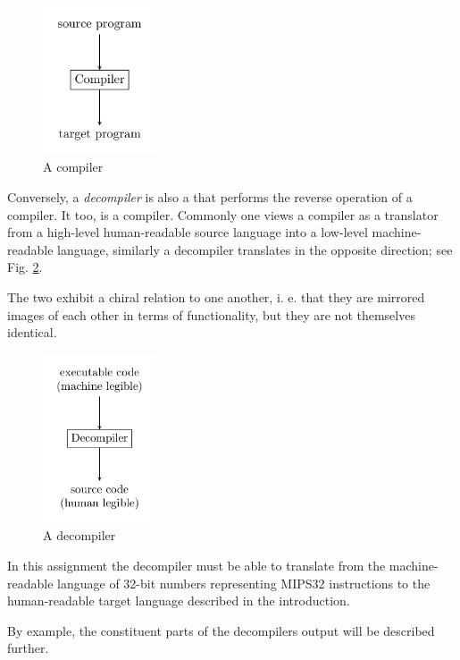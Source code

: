 \begin{figure}[H]
  \centering
  \includegraphics[width=0.3\textwidth]{figures/compiler.png}
  \caption{A compiler}
  \label{fig:compiler}
\end{figure}

Conversely, a \emph{decompiler} is also a that performs the reverse
operation of a compiler. It too, is a compiler. Commonly one views a
compiler as a translator from a high-level human-readable source
language into a low-level machine-readable language, similarly a
decompiler translates in the opposite direction; see
Fig. \ref{fig:decompiler}. 

The two exhibit a chiral relation to one another, i. e. that they are
mirrored images of each other in terms of functionality, but they are
not themselves identical.

\begin{figure}[H]
  \centering
  \includegraphics[width=0.3\textwidth]{figures/decompiler.png}
  \caption{A decompiler}
  \label{fig:decompiler}
\end{figure}

In this assignment the decompiler must be able to translate from the
machine-readable language of 32-bit numbers representing MIPS32
instructions to the human-readable target language described in the
introduction.

By example, the constituent parts of the decompilers output will
be described further.

